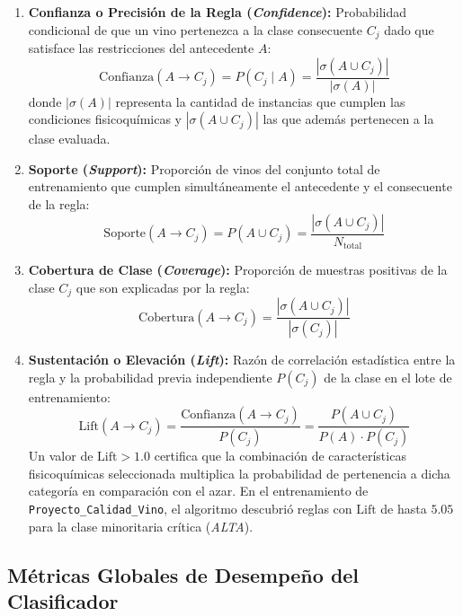 \documentclass{article}
\begin{document}
\begin{enumerate}
    \item \textbf{Confianza o Precisión de la Regla (\textit{Confidence}):} Probabilidad condicional de que un vino pertenezca a la clase consecuente $C_j$ dado que satisface las restricciones del antecedente $A$:
    \begin{equation}
        \text{Confianza}(A \to C_j) = P(C_j \mid A) = \frac{|\sigma(A \cup C_j)|}{|\sigma(A)|}
    \end{equation}
    donde $|\sigma(A)|$ representa la cantidad de instancias que cumplen las condiciones fisicoquímicas y $|\sigma(A \cup C_j)|$ las que además pertenecen a la clase evaluada.
    \item \textbf{Soporte (\textit{Support}):} Proporción de vinos del conjunto total de entrenamiento que cumplen simultáneamente el antecedente y el consecuente de la regla:
    \begin{equation}
        \text{Soporte}(A \to C_j) = P(A \cup C_j) = \frac{|\sigma(A \cup C_j)|}{N_{\text{total}}}
    \end{equation}
    \item \textbf{Cobertura de Clase (\textit{Coverage}):} Proporción de muestras positivas de la clase $C_j$ que son explicadas por la regla:
    \begin{equation}
        \text{Cobertura}(A \to C_j) = \frac{|\sigma(A \cup C_j)|}{|\sigma(C_j)|}
    \end{equation}
    \item \textbf{Sustentación o Elevación (\textit{Lift}):} Razón de correlación estadística entre la regla y la probabilidad previa independiente $P(C_j)$ de la clase en el lote de entrenamiento:
    \begin{equation}
        \text{Lift}(A \to C_j) = \frac{\text{Confianza}(A \to C_j)}{P(C_j)} = \frac{P(A \cup C_j)}{P(A) \cdot P(C_j)}
    \end{equation}
    Un valor de $\text{Lift} > 1.0$ certifica que la combinación de características fisicoquímicas seleccionada multiplica la probabilidad de pertenencia a dicha categoría en comparación con el azar. En el entrenamiento de \texttt{Proyecto\_Calidad\_Vino}, el algoritmo descubrió reglas con $\text{Lift}$ de hasta $\mathbf{5.05}$ para la clase minoritaria crítica (\textit{ALTA}).
\end{enumerate}

\subsection{Métricas Globales de Desempeño del Clasificador}
\end{document}
